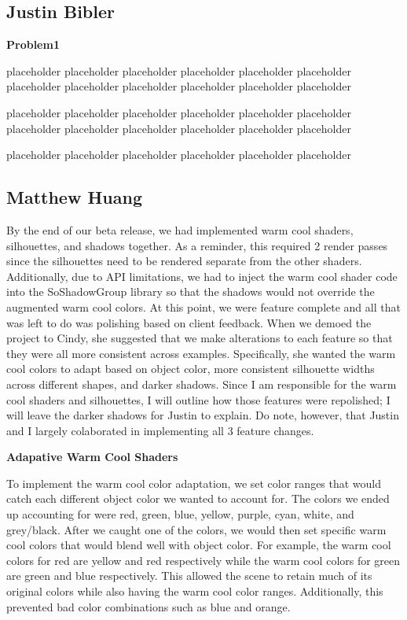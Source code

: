 \documentclass[10pt,journal,compsoc,draftclsnofoot]{IEEEtran}
\begin{document}
\begin{flushleft}
\subsection{Justin Bibler}
\textbf{Problem1}
\par
placeholder placeholder placeholder placeholder placeholder placeholder
placeholder placeholder placeholder placeholder placeholder placeholder
\par
placeholder placeholder placeholder placeholder placeholder placeholder
placeholder placeholder placeholder placeholder placeholder placeholder
\par
placeholder placeholder placeholder placeholder placeholder placeholder

\newpage

\subsection{Matthew Huang}
\par
By the end of our beta release, we had implemented warm cool shaders, silhouettes, and shadows together.
As a reminder, this required 2 render passes since the silhouettes need to be rendered separate from the other shaders.
Additionally, due to API limitations, we had to inject the warm cool shader code into the SoShadowGroup library so that the shadows would not override the augmented warm cool colors.
At this point, we were feature complete and all that was left to do was polishing based on client feedback.
When we demoed the project to Cindy, she suggested that we make alterations to each feature so that they were all more consistent across examples.
Specifically, she wanted the warm cool colors to adapt based on object color, more consistent silhouette widths across different shapes, and darker shadows.
Since I am responsible for the warm cool shaders and silhouettes, I will outline how those features were repolished; I will leave the darker shadows for Justin to explain.
Do note, however, that Justin and I largely colaborated in implementing all 3 feature changes.
\vspace{3mm}

\textbf{Adapative Warm Cool Shaders}
\par
To implement the warm cool color adaptation, we set color ranges that would catch each different object color we wanted to account for.
The colors we ended up accounting for were red, green, blue, yellow, purple, cyan, white, and grey/black.
After we caught one of the colors, we would then set specific warm cool colors that would blend well with object color.
For example, the warm cool colors for red are yellow and red respectively while the warm cool colors for green are green and blue respectively.
This allowed the scene to retain much of its original colors while also having the warm cool color ranges.
Additionally, this prevented bad color combinations such as blue and orange.
\vspace{3mm}


\end{flushleft}
\end{document}
